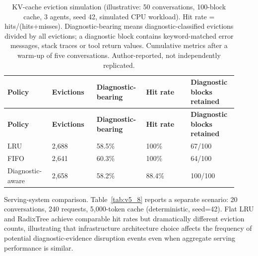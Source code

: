 \documentclass[preprint,12pt]{elsarticle}
\begin{document}
\begin{center}
\begingroup
\setlength{\tabcolsep}{2pt}
\renewcommand{\arraystretch}{1.16}
\footnotesize
\begin{longtable}{|p{0.183\linewidth}|p{0.183\linewidth}|p{0.183\linewidth}|p{0.183\linewidth}|p{0.183\linewidth}|}
\caption{KV-cache eviction simulation (illustrative: 50 conversations, 100-block cache, 3 agents, seed 42, simulated CPU workload). Hit rate = hits/(hits+misses). Diagnostic-bearing means diagnostic-classified evictions divided by all evictions; a diagnostic block contains keyword-matched error messages, stack traces or tool return values. Cumulative metrics after a warm-up of five conversations. Author-reported, not independently replicated.}\label{tab:v5_7}\\
\hline
\textbf{Policy} & \textbf{Evictions} & \textbf{Diagnostic-bearing} & \textbf{Hit rate} & \textbf{Diagnostic blocks retained} \\ \hline
\endfirsthead
\textbf{Policy} & \textbf{Evictions} & \textbf{Diagnostic-bearing} & \textbf{Hit rate} & \textbf{Diagnostic blocks retained} \\ \hline
\endhead
LRU & 2,688 & 58.5\% & 100\% & 67/100 \\ \hline
FIFO & 2,641 & 60.3\% & 100\% & 64/100 \\ \hline
Diagnostic-aware & 2,658 & 58.2\% & 88.4\% & 100/100 \\ \hline
\end{longtable}
\endgroup
\end{center}
Serving-system comparison. Table~\ref{tab:v5_8} reports a separate scenario: 20 conversations, 240 requests, 5,000-token cache (deterministic, seed=42). Flat LRU and RadixTree achieve comparable hit rates but dramatically different eviction counts, illustrating that infrastructure architecture choice affects the frequency of potential diagnostic-evidence disruption events even when aggregate serving performance is similar.
\end{document}
